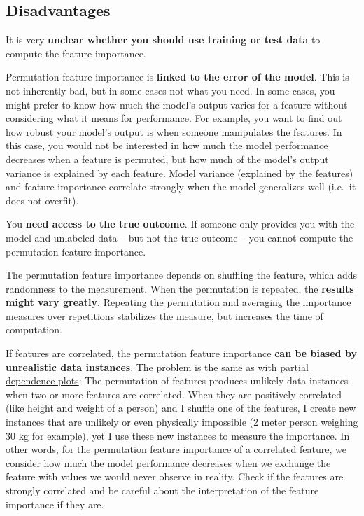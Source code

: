 \documentclass[
  12pt,
]{krantz}
\begin{document}
\hypertarget{disadvantages-9}{%
\subsection{Disadvantages}\label{disadvantages-9}}

It is very \textbf{unclear whether you should use training or test data} to compute the feature importance.

Permutation feature importance is \textbf{linked to the error of the model}.
This is not inherently bad, but in some cases not what you need.
In some cases, you might prefer to know how much the model's output varies for a feature without considering what it means for performance.
For example, you want to find out how robust your model's output is when someone manipulates the features.
In this case, you would not be interested in how much the model performance decreases when a feature is permuted, but how much of the model's output variance is explained by each feature.
Model variance (explained by the features) and feature importance correlate strongly when the model generalizes well (i.e.~it does not overfit).

You \textbf{need access to the true outcome}.
If someone only provides you with the model and unlabeled data -- but not the true outcome -- you cannot compute the permutation feature importance.

The permutation feature importance depends on shuffling the feature, which adds randomness to the measurement.
When the permutation is repeated, the \textbf{results might vary greatly}.
Repeating the permutation and averaging the importance measures over repetitions stabilizes the measure, but increases the time of computation.

If features are correlated, the permutation feature importance \textbf{can be biased by unrealistic data instances}.
The problem is the same as with \protect\hyperlink{pdp}{partial dependence plots}:
The permutation of features produces unlikely data instances when two or more features are correlated.
When they are positively correlated (like height and weight of a person) and I shuffle one of the features, I create new instances that are unlikely or even physically impossible (2 meter person weighing 30 kg for example), yet I use these new instances to measure the importance.
In other words, for the permutation feature importance of a correlated feature, we consider how much the model performance decreases when we exchange the feature with values we would never observe in reality.
Check if the features are strongly correlated and be careful about the interpretation of the feature importance if they are.
\end{document}
